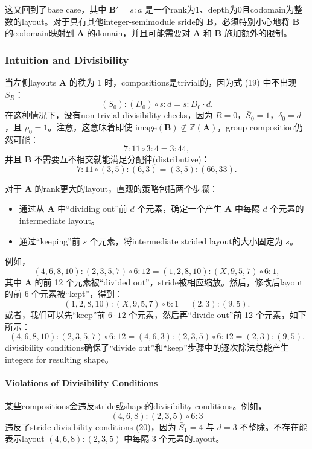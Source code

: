\documentclass{article}
\begin{document}
这又回到了base case，其中 \(\mathbf{B}' = s : a\) 是一个rank为1、depth为0且codomain为整数的layout。对于具有其他integer-semimodule sride的 \(\mathbf{B}\)，必须特别小心地将 \(\mathbf{B}\) 的codomain映射到 \(\mathbf{A}\) 的domain，并且可能需要对 \(\mathbf{A}\) 和 \(\mathbf{B}\) 施加额外的限制。

\subsubsection{Intuition and Divisibility}
当左侧layouts \(\mathbf{A}\) 的秩为 1 时，compositions是trivial的，因为式 (19) 中不出现 \(S_R\)：
\[
(S_0) : (D_0) \circ s : d = s : D_0 \cdot d.
\]
在这种情况下，没有non-trivial divisibility checks，因为 \(R = 0\)，\(\bar{S}_0 = 1\)，\(\delta_0 = d\)，且 \(\rho_0 = 1\)。注意，这意味着即使 \(\mathrm{image}(\mathbf{B}) \not\subseteq \mathbb{Z}(\mathbf{A})\)，group composition仍然可能：
\[
7 : 11 \circ 3 : 4 = 3 : 44,
\]
并且 \(\mathbf{B}\) 不需要互不相交就能满足分配律(distributive)：
\[
7 : 11 \circ (3,5) : (6,3) = (3,5) : (66,33).
\]

对于 \(\mathbf{A}\) 的rank更大的layout，直观的策略包括两个步骤：
\begin{itemize}
\item 通过从 \(\mathbf{A}\) 中“dividing out”前 \(d\) 个元素，确定一个产生 \(\mathbf{A}\) 中每隔 \(d\) 个元素的intermediate layout。
\item 通过“keeping”前 \(s\) 个元素，将intermediate strided layout的大小固定为 \(s\)。
\end{itemize}

例如，
\[
(4,6,8,10) : (2,3,5,7) \circ 6 : 12 = (1,2,8,10) : (X,9,5,7) \circ 6 : 1,
\]
其中 \(\mathbf{A}\) 的前 12 个元素被“divided out”，stride被相应缩放。然后，修改后layout的前 6 个元素被“kept”，得到：
\[
(1,2,8,10) : (X,9,5,7) \circ 6 : 1 = (2,3) : (9,5).
\]
或者，我们可以先“keep”前 \(6 \cdot 12\) 个元素，然后再“divide out”前 12 个元素，如下所示：
\[
(4,6,8,10) : (2,3,5,7) \circ 6 : 12 = (4,6,3) : (2,3,5) \circ 6 : 12 = (2,3) : (9,5).
\]
divisibility conditions确保了“divide out”和“keep”步骤中的逐次除法总能产生integers for resulting shape。

\paragraph{Violations of Divisibility Conditions}
某些compositions会违反stride或shape的divisibility conditions。例如，
\[
(4,6,8) : (2,3,5) \circ 6 : 3
\]
违反了stride divisibility conditions (20)，因为 \(\bar{S}_1 = 4\) 与 \(d = 3\) 不整除。不存在能表示layout \((4,6,8) : (2,3,5)\) 中每隔 3 个元素的layout。
\end{document}

